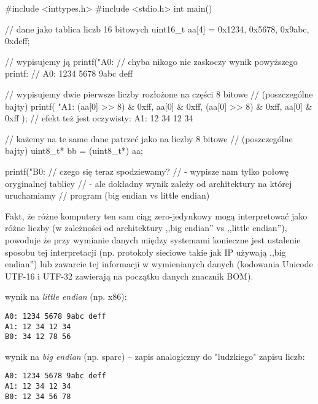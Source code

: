 \documentclass{pdfBooklets}
\begin{document}
\begin{CodeFrame*}[c]{}
#include <inttypes.h>
#include <stdio.h>
int main() {
	// dane jako tablica liczb 16 bitowych
	uint16_t aa[4] = {0x1234, 0x5678, 0x9abc, 0xdeff};
	
	// wypisujemy ją
	printf("A0: %
	// chyba nikogo nie zaskoczy wynik powyższego printf:
	//   A0: 1234 5678 9abc deff
	
	// wypisujemy dwie pierwsze liczby rozłożone na części 8 bitowe
	// (poszczególne bajty)
	printf(
		"A1: %
		(aa[0] >> 8) & 0xff, aa[0] & 0xff,
		(aa[0] >> 8) & 0xff, aa[0] & 0xff
	);
	// efekt też jest oczywisty:  A1: 12 34 12 34
	
	// każemy na te same dane patrzeć jako na liczby 8 bitowe
	// (poszczególne bajty)
	uint8_t* bb = (uint8_t*) aa;
	
	printf("B0: %
	// czego się teraz spodziewamy?
	//  - wypisze nam tylko połowę oryginalnej tablicy
	//  - ale dokładny wynik zależy od architektury na której uruchamiamy
	//    program (big endian vs little endian)
}
\end{CodeFrame*}

Fakt, że różne komputery ten sam ciąg zero-jedynkowy mogą interpretować jako różne liczby (w zależności od architektury ,,big endian'' vs ,,little endian''), powoduje że przy wymianie danych między systemami konieczne jest ustalenie sposobu tej interpretacji (np. protokoły sieciowe takie jak IP używają ,,big endian'') lub zawarcie tej informacji w wymienianych danych (kodowania Unicode UTF-16 i UTF-32 zawierają na początku danych znacznik BOM).

\begin{teacherOnly}
\begin{minipage}[t]{0.38\textwidth}
wynik na \emph{little endian} (np. x86):
\begin{Verbatim}
A0: 1234 5678 9abc deff
A1: 12 34 12 34
B0: 34 12 78 56
\end{Verbatim}
\end{minipage}
\hfill
\begin{minipage}[t]{0.58\textwidth}
wynik na \emph{big endian} (np. sparc) – zapis analogiczny do "ludzkiego" zapisu liczb:
\begin{Verbatim}
A0: 1234 5678 9abc deff
A1: 12 34 12 34
B0: 12 34 56 78
\end{Verbatim}
\end{minipage}
\end{teacherOnly}
\end{document}
